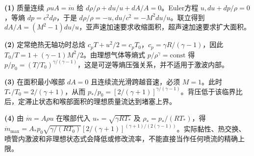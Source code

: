 \par\noindent\textbf{(1)} 质量连续 \(\rho uA=\dot m\) 给 \(d\rho/\rho+du/u+dA/A=0\)。Euler方程 \(u,du+dp/\rho=0\)，等熵 \(dp=c^2d\rho\)，于是 \(d\rho/\rho=-u,du/c^2=-M^2du/u\)。联立得到 \(dA/A=(M^2-1)du/u\)，亚声速加速要求收缩面积，超声速加速要求扩大面积。
\par\noindent\textbf{(2)} 定常绝热无轴功时总焓 \(c_pT+u^2/2=c_pT_0\)，\(c_p=\gamma R/(\gamma-1)\)，因此 \(T_0/T=1+(\gamma-1)M^2/2\)。由理想气体等熵式 \(p/\rho^\gamma=\mathrm{const}\) 得 \(p/p_0=(T/T_0)^{\gamma/(\gamma-1)}\)，这是可逆等熵压强关系，并不适用于激波内部。
\par\noindent\textbf{(3)} 在面积最小喉部 \(dA=0\) 且连续流光滑跨越音速，必须 \(M=1\)。此时 \(T_*/T_0=2/(\gamma+1)\)，从而 \(p_*/p_0=[2/(\gamma+1)]^{\gamma/(\gamma-1)}\)。背压低于该临界比后，定滞止状态和喉部面积的理想质量流达到堵塞上界。
\par\noindent\textbf{(4)} 由 \(\dot m=A\rho u\) 在喉部代入 \(u_*=\sqrt{\gamma RT_*}\) 及 \(\rho_*=p_*/(RT_*)\)，得 \(\dot m_{\max}=A_*p_0\sqrt{\gamma/(RT_0)}[2/(\gamma+1)]^{(\gamma+1)/(2(\gamma-1))}\)。实际黏性、热交换、喷管内激波和非理想状态式会降低或修改流率，不能直接当作任何喷流的精确上限。
